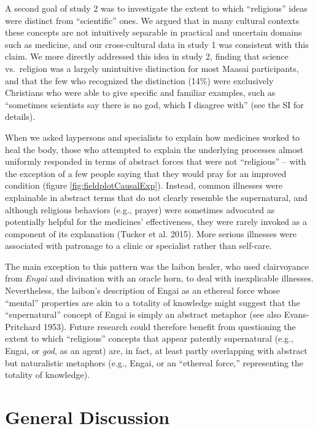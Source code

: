\documentclass[
  11pt,
]{article}
\begin{document}
A second goal of study 2 was to investigate the extent to which ``religious'' ideas were distinct from ``scientific'' ones. We argued that in many cultural contexts these concepts are not intuitively separable in practical and uncertain domains such as medicine, and our cross-cultural data in study 1 was consistent with this claim. We more directly addressed this idea in study 2, finding that science vs.~religion was a largely unintuitive distinction for most Maasai participants, and that the few who recognized the distinction (14\%) were exclusively Christians who were able to give specific and familiar examples, such as ``sometimes scientists say there is no god, which I disagree with'' (see the SI for details).

When we asked laypersons and specialists to explain how medicines worked to heal the body, those who attempted to explain the underlying processes almost uniformly responded in terms of abstract forces that were not ``religious'' -- with the exception of a few people saying that they would pray for an improved condition (figure \ref{fig:fieldplotCausalExp}). Instead, common illnesses were explainable in abstract terms that do not clearly resemble the supernatural, and although religious behaviors (e.g., prayer) were sometimes advocated as potentially helpful for the medicines' effectiveness, they were rarely invoked as a component of its explanation (Tucker et al. 2015). More serious illnesses were associated with patronage to a clinic or specialist rather than self-care.

The main exception to this pattern was the laibon healer, who used clairvoyance from \emph{Engai} and divination with an oracle horn, to deal with inexplicable illnesses. Nevertheless, the laibon's description of Engai as an ethereal force whose ``mental'' properties are akin to a totality of knowledge might suggest that the ``supernatural'' concept of Engai is simply an abstract metaphor (see also Evans-Pritchard 1953). Future research could therefore benefit from questioning the extent to which ``religious'' concepts that appear patently supernatural (e.g., Engai, or \emph{god}, as an agent) are, in fact, at least partly overlapping with abstract but naturalistic metaphors (e.g., Engai, or an ``ethereal force,'' representing the totality of knowledge).

\hypertarget{general-discussion}{%
\section{General Discussion}\label{general-discussion}}
\end{document}
